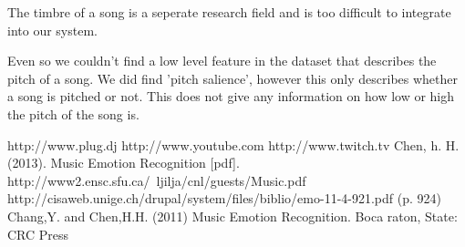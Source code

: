 \documentclass[10pt,a4paper]{article}
\begin{document}
The timbre of a song is a seperate research field and is too difficult to integrate into our system.

Even so we couldn't find a low level feature in the dataset that describes the pitch of a song.
We did find 'pitch salience', however this only describes whether a song is pitched or not.
This does not give any information on how low or high the pitch of the song is.

%
%

\begin{thebibliography}{10}
 http://www.plug.dj
 http://www.youtube.com
 http://www.twitch.tv
 Chen, h. H. (2013). Music Emotion Recognition [pdf]. http://www2.ensc.sfu.ca/~ljilja/cnl/guests/Music.pdf
 http://cisaweb.unige.ch/drupal/system/files/biblio/emo-11-4-921.pdf (p. 924)
 Chang,Y. and Chen,H.H. (2011) Music Emotion Recognition. Boca raton, State: CRC Press %

\end{thebibliography}
\end{document}
